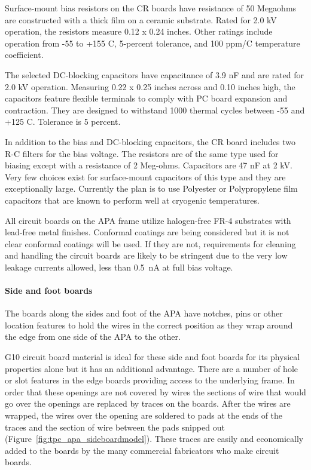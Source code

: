 Surface-mount bias resistors on the CR boards have resistance of 50 Megaohms are constructed with a thick film on a ceramic substrate. Rated for 2.0 kV operation, the resistors measure 0.12 x 0.24 inches. Other ratings include operation from -55 to +155 C, 5-percent tolerance, and 100 ppm/C temperature coefficient.

The selected DC-blocking capacitors have capacitance of 3.9 nF and are rated for 2.0 kV operation. Measuring 0.22 x 0.25 inches across and 0.10 inches high, the capacitors feature flexible terminals to comply with PC board expansion and contraction. They are designed to withstand 1000 thermal cycles between -55 and +125 C. Tolerance is 5 percent.

In addition to the bias and DC-blocking capacitors, the CR board includes two R-C filters for the bias voltage. The resistors are of the same type used for biasing except with a resistance of 2 Meg-ohms. Capacitors are 47 nF at 2 kV. Very few choices exist for surface-mount capacitors of this type and they are exceptionally large. Currently the plan is to use Polyester or Polypropylene film capacitors that are known to perform well at cryogenic temperatures.

All circuit boards on the APA frame utilize halogen-free FR-4 substrates with lead-free metal finishes. Conformal coatings are being considered but it is not clear conformal coatings will be used. If they are not, requirements for cleaning and handling the circuit boards are likely to be stringent due to the very low leakage currents allowed, less than 0.5~nA at full bias voltage.

\paragraph{Side and foot boards}

The boards along the sides and foot of the APA have notches, pins or other location features to hold the wires in the correct position as they wrap around the edge from one side of the APA to the other.

G10 circuit board material is ideal for these side and foot boards for its physical properties alone but it has an additional advantage.  There are a number of hole or slot features in the edge boards providing access to the underlying frame.  In order that these openings are not covered by wires the sections of wire that would go over the openings are replaced by traces on the boards.  After the wires are wrapped, the wires over the opening are soldered to pads at the ends of the traces and the section of wire between the pads snipped out (Figure~\ref{fig:tpc_apa_sideboardmodel}).  These traces are easily and economically added to the boards by the many commercial fabricators who make circuit boards. 

